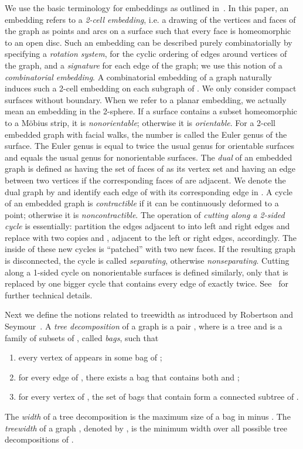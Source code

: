 \documentclass{article}
\begin{document}
We use the basic terminology for embeddings as outlined
in~\cite{MoharThomassen01}. In this paper, an embedding refers to a
\emph{2-cell embedding}, i.e. a drawing of the vertices and faces of
the graph as points and arcs on a surface such that every face is
homeomorphic to an open disc. Such an embedding can be described
purely combinatorially by specifying a \emph{rotation system}, for the
cyclic ordering of edges around vertices of the graph, and a
\emph{signature} for each edge of the graph; we use this notion of a
\emph{combinatorial embedding}. A combinatorial embedding of a graph
 naturally induces such a 2-cell embedding on each subgraph of
. We only consider compact surfaces without boundary. When we refer
to a planar embedding, we actually mean an embedding in the 2-sphere.
If a surface contains a subset homeomorphic to a M\"obius strip, it is
\emph{nonorientable}; otherwise it is \emph{orientable}. For a 2-cell
embedded graph  with  facial walks, the number  is called the Euler genus of the surface. The Euler genus is equal
to twice the usual genus for orientable surfaces and equals the usual
genus for nonorientable surfaces. The \emph{dual} of an embedded
graph  is defined as having the set of faces of  as its vertex
set and having an edge between two vertices if the corresponding faces
of  are adjacent.  We denote the dual graph by  and
identify each edge of  with its corresponding edge in .  A
cycle of an embedded graph is \emph{contractible} if it can be
continuously deformed to a point; otherwise it is
\emph{noncontractible}. The operation of \emph{cutting along a
  2-sided cycle}  is essentially: partition the edges adjacent to
 into left and right edges and replace  with two copies 
and , adjacent to the left or right edges, accordingly. The
inside of these new cycles is ``patched'' with two new faces. If the
resulting graph is disconnected, the cycle is called
\emph{separating}, otherwise \emph{nonseparating}.  Cutting along a
1-sided cycle  on nonorientable surfaces is defined similarly,
only that  is replaced by one bigger cycle  that contains every
edge of  exactly twice.  See~\cite[pages
  105--106]{MoharThomassen01} for further technical details.

Next we define the notions related to treewidth as introduced by
Robertson and Seymour~\cite{GraphMinors02}. A \emph{tree
  decomposition} of a graph  is a pair , where
 is a tree and  is a family of
subsets of , called \emph{bags}, such that
\begin{enumerate} \item every vertex of  appears in some bag of ;
\item for every edge  of , there exists a bag that contains
  both  and ;
\item for every vertex  of , the set of bags that contain 
  form a connected subtree  of .
\end{enumerate}
The \emph{width} of a tree decomposition is the maximum size of a bag
in  minus . The \emph{treewidth} of a graph , denoted by
, is the minimum width over all possible tree decompositions
of . 
\end{document}
